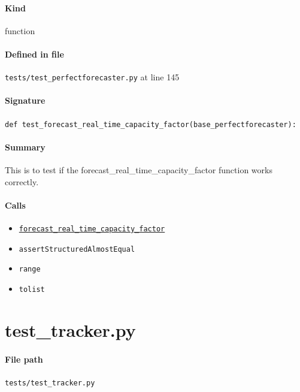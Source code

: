 \documentclass[11pt]{report}
\begin{document}
\paragraph{Kind} function
\paragraph{Defined in file} \texttt{tests/test\_perfectforecaster.py} at line 145
\paragraph{Signature} \texttt{def test\_forecast\_real\_time\_capacity\_factor(base\_perfectforecaster):}
\paragraph{Summary} This is to test if the forecast\_real\_time\_capacity\_factor function works correctly.
\paragraph{Calls}
\begin{itemize}[leftmargin=*]
  \item \hyperref[def:forecaster.py:PerfectForecaster.forecast_real_time_capacity_factor:L793]{\texttt{forecast\_real\_time\_capacity\_factor}}
  \item \texttt{assertStructuredAlmostEqual}
  \item \texttt{range}
  \item \texttt{tolist}
\end{itemize}

\section{test\_tracker.py}
\label{file:tests-test_tracker.py}
\paragraph{File path} \texttt{tests/test\_tracker.py}
\end{document}
